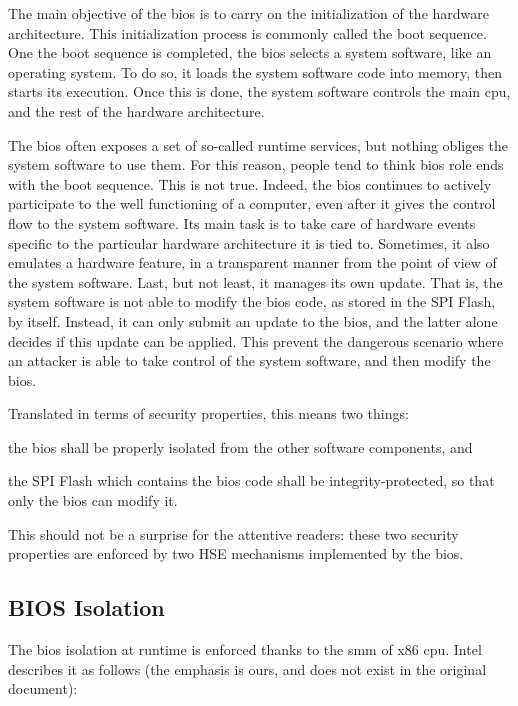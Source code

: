 The main objective of the \ac{bios} is to carry on the initialization of the
hardware architecture.
%
This initialization process is commonly called the boot sequence.
%
One the boot sequence is completed, the \ac{bios} selects a system software,
like an operating system.
%
To do so, it loads the system software code into memory, then starts its
execution.
%
Once this is done, the system software controls the main \ac{cpu}, and the rest
of the hardware architecture.

The \ac{bios} often exposes a set of so-called runtime services, but nothing
obliges the system software to use them.
%
For this reason, people tend to think \ac{bios} role ends with the boot
sequence.
%
This is not true.
%
Indeed, the \ac{bios} continues to actively participate to the well functioning
of a computer, even after it gives the control flow to the system software.
%
Its main task is to take care of hardware events specific to the particular
hardware architecture it is tied to.
%
Sometimes, it also emulates a hardware feature, in a transparent manner from the
point of view of the system software.  
%
Last, but not least, it manages its own update.
%
That is, the system software is not able to modify the \ac{bios} code, as stored
in the SPI Flash, by itself.
%
Instead, it can only submit an update to the \ac{bios}, and the latter alone
decides if this update can be applied.
%
This prevent the dangerous scenario where an attacker is able to take control of
the system software, and then modify the \ac{bios}.

Translated in terms of security properties, this means two things:
%
\begin{inparaenum}[(1)]
\item the \ac{bios} shall be properly isolated from the other software
  components, and
\item the SPI Flash which contains the \ac{bios} code shall be
  integrity-protected, so that only the \ac{bios} can modify it.
\end{inparaenum}
%
This should not be a surprise for the attentive readers: these two security
properties are enforced by two HSE mechanisms implemented by the \ac{bios}.

\subsection{BIOS Isolation}

The \ac{bios} isolation at runtime is enforced thanks to the \ac{smm} of x86
\ac{cpu}.
%
Intel describes it as follows (the emphasis is ours, and does not exist in the
original document):

